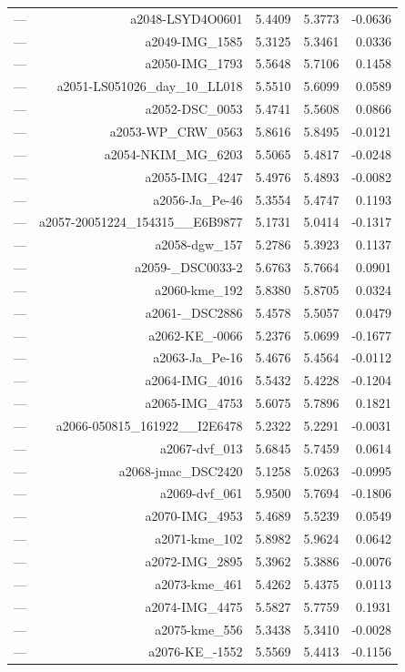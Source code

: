 \begin{table}[htbp]
\begin{tabular}{lrrrr}
— & a2048-LSYD4O0601 & 5.4409 & 5.3773 & -0.0636 \\
— & a2049-IMG_1585 & 5.3125 & 5.3461 & 0.0336 \\
— & a2050-IMG_1793 & 5.5648 & 5.7106 & 0.1458 \\
— & a2051-LS051026_day_10_LL018 & 5.5510 & 5.6099 & 0.0589 \\
— & a2052-DSC_0053 & 5.4741 & 5.5608 & 0.0866 \\
— & a2053-WP_CRW_0563 & 5.8616 & 5.8495 & -0.0121 \\
— & a2054-NKIM_MG_6203 & 5.5065 & 5.4817 & -0.0248 \\
— & a2055-IMG_4247 & 5.4976 & 5.4893 & -0.0082 \\
— & a2056-Ja_Pe-46 & 5.3554 & 5.4747 & 0.1193 \\
— & a2057-20051224_154315__E6B9877 & 5.1731 & 5.0414 & -0.1317 \\
— & a2058-dgw_157 & 5.2786 & 5.3923 & 0.1137 \\
— & a2059-_DSC0033-2 & 5.6763 & 5.7664 & 0.0901 \\
— & a2060-kme_192 & 5.8380 & 5.8705 & 0.0324 \\
— & a2061-_DSC2886 & 5.4578 & 5.5057 & 0.0479 \\
— & a2062-KE_-0066 & 5.2376 & 5.0699 & -0.1677 \\
— & a2063-Ja_Pe-16 & 5.4676 & 5.4564 & -0.0112 \\
— & a2064-IMG_4016 & 5.5432 & 5.4228 & -0.1204 \\
— & a2065-IMG_4753 & 5.6075 & 5.7896 & 0.1821 \\
— & a2066-050815_161922__I2E6478 & 5.2322 & 5.2291 & -0.0031 \\
— & a2067-dvf_013 & 5.6845 & 5.7459 & 0.0614 \\
— & a2068-jmac_DSC2420 & 5.1258 & 5.0263 & -0.0995 \\
— & a2069-dvf_061 & 5.9500 & 5.7694 & -0.1806 \\
— & a2070-IMG_4953 & 5.4689 & 5.5239 & 0.0549 \\
— & a2071-kme_102 & 5.8982 & 5.9624 & 0.0642 \\
— & a2072-IMG_2895 & 5.3962 & 5.3886 & -0.0076 \\
— & a2073-kme_461 & 5.4262 & 5.4375 & 0.0113 \\
— & a2074-IMG_4475 & 5.5827 & 5.7759 & 0.1931 \\
— & a2075-kme_556 & 5.3438 & 5.3410 & -0.0028 \\
— & a2076-KE_-1552 & 5.5569 & 5.4413 & -0.1156 \\

\end{tabular}
\end{table}
